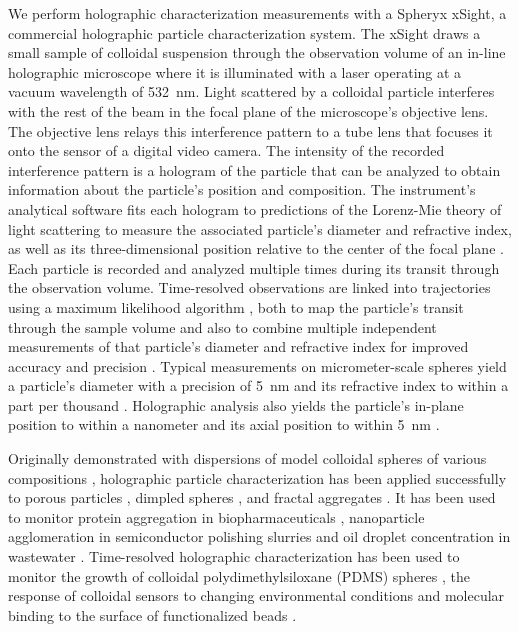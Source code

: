 \documentclass[journal=langd5,manuscript=article]{achemso}
\begin{document}
We perform holographic characterization measurements with a Spheryx xSight,
a commercial holographic particle characterization system.
The xSight draws a small sample of colloidal suspension through the
observation volume of an in-line holographic microscope where it is illuminated
with a laser operating at a vacuum wavelength of \SI{532}{\nm}.
Light scattered by a colloidal particle interferes with the rest of the
beam in the focal plane of the microscope's objective lens.
The objective lens relays this interference pattern to a tube
lens that focuses it onto the sensor of a digital video camera.
The intensity of the recorded interference pattern is
a hologram of the particle that can be analyzed to obtain information
about the particle's position and composition.
The instrument's analytical software fits each hologram 
to predictions of the Lorenz-Mie theory of light scattering
to measure the associated particle's diameter and refractive index, as well as its
three-dimensional position relative to the center of the 
focal plane \cite{lee07a}.
Each particle is recorded and analyzed multiple times during its
transit through the observation volume.
Time-resolved observations are linked into trajectories
using a maximum likelihood algorithm
\cite{crocker1996methods}, both to map the particle's
transit through the sample volume and also to
combine multiple independent measurements 
of that particle's diameter and refractive index
for improved accuracy and precision \cite{cheong2009flow}.
Typical measurements on micrometer-scale spheres yield
a particle's diameter with a precision of
\SI{5}{\nm} and its refractive index to
within a part per thousand
\cite{krishnatreya14,wang2016holographic}.
Holographic analysis also yields the particle's
in-plane position to within a nanometer and its
axial position to within \SI{5}{\nm}
\cite{cheong2009flow,krishnatreya14}.

Originally demonstrated with dispersions of model
colloidal spheres of various compositions \cite{lee07a},
holographic particle characterization has been
applied successfully to porous particles \cite{cheong11},
dimpled spheres \cite{hannel2015holographic},
and fractal aggregates \cite{wang2016fractal}.
It has been used to monitor protein aggregation 
in biopharmaceuticals
\cite{wang2016holographic,kasimbeg2019holographic}, 
nanoparticle agglomeration in semiconductor polishing
slurries \cite{cheong17} and oil droplet concentration in
wastewater \cite{philips2017holographic}.
Time-resolved holographic characterization has been used to
monitor the growth of colloidal polydimethylsiloxane (PDMS)
spheres \cite{wang15}, the response of colloidal
sensors to changing environmental conditions
\cite{wang2015stimulus} and molecular binding
to the surface of functionalized beads \cite{cheong2009flow}.
\end{document}
